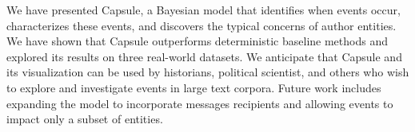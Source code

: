 We have presented Capsule, a Bayesian model that identifies when events occur, characterizes these events, and discovers the typical concerns of author entities.  We have shown that Capsule outperforms deterministic baseline methods and explored its results on three real-world datasets.
We anticipate that Capsule and its visualization can be used by historians, political scientist, and others who wish to explore and investigate events in large text corpora.  
Future work includes expanding the model to incorporate messages recipients and allowing events to impact only a subset of entities.